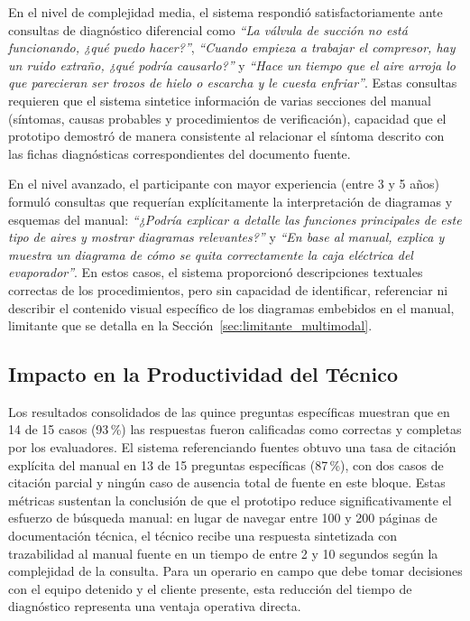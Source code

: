 {{En el nivel de complejidad media, el sistema respondió satisfactoriamente ante consultas de diagnóstico diferencial como \textit{``La válvula de succión no está funcionando, ¿qué puedo hacer?''}, \textit{``Cuando empieza a trabajar el compresor, hay un ruido extraño, ¿qué podría causarlo?''} y \textit{``Hace un tiempo que el aire arroja lo que parecieran ser trozos de hielo o escarcha y le cuesta enfriar''}. Estas consultas requieren que el sistema sintetice información de varias secciones del manual (síntomas, causas probables y procedimientos de verificación), capacidad que el prototipo demostró de manera consistente al relacionar el síntoma descrito con las fichas diagnósticas correspondientes del documento fuente.

En el nivel avanzado, el participante con mayor experiencia (entre 3 y 5 años) formuló consultas que requerían explícitamente la interpretación de diagramas y esquemas del manual: \textit{``¿Podría explicar a detalle las funciones principales de este tipo de aires y mostrar diagramas relevantes?''} y \textit{``En base al manual, explica y muestra un diagrama de cómo se quita correctamente la caja eléctrica del evaporador''}. En estos casos, el sistema proporcionó descripciones textuales correctas de los procedimientos, pero sin capacidad de identificar, referenciar ni describir el contenido visual específico de los diagramas embebidos en el manual, limitante que se detalla en la Sección~\ref{sec:limitante_multimodal}.

\subsection{Impacto en la Productividad del Técnico}

Los resultados consolidados de las quince preguntas específicas muestran que en 14 de 15 casos (93\,\%) las respuestas fueron calificadas como correctas y completas por los evaluadores. El sistema referenciando fuentes obtuvo una tasa de citación explícita del manual en 13 de 15 preguntas específicas (87\,\%), con dos casos de citación parcial y ningún caso de ausencia total de fuente en este bloque. Estas métricas sustentan la conclusión de que el prototipo reduce significativamente el esfuerzo de búsqueda manual: en lugar de navegar entre 100 y 200 páginas de documentación técnica, el técnico recibe una respuesta sintetizada con trazabilidad al manual fuente en un tiempo de entre 2 y 10 segundos según la complejidad de la consulta. Para un operario en campo que debe tomar decisiones con el equipo detenido y el cliente presente, esta reducción del tiempo de diagnóstico representa una ventaja operativa directa.

}}
